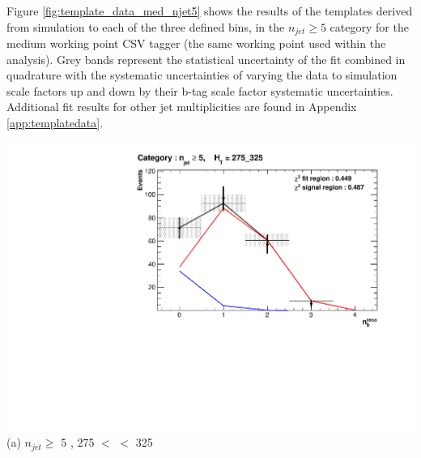 Figure \ref{fig:template_data_med_njet5} shows the results of the templates derived from simulation to each of the three defined \theht bins, in the $n_{jet} \geq 5$ category for the medium working point \ac{CSV} tagger (the same working point used within the \alphat analysis).  Grey bands represent the statistical uncertainty of the fit combined in quadrature with the systematic uncertainties of varying the data to simulation scale factors up and down by their b-tag scale factor systematic uncertainties.  Additional fit results for other jet multiplicities are found in Appendix \ref{app:templatedata}.

\begin{minipage}{\textwidth}
\footnotesize
\centering
\begin{minipage}[b]{0.51 \linewidth}
\includegraphics[width = 1.0\linewidth]{plots/ThesisPlots/Final_Fit_To_Data_Normal_Medium_HTBin_OneMuon_275_325_jet_mult_5.pdf}
\centering (a) $n_{jet} \geq$  5 , 275 $<$ \theht $<$ 325
\end{minipage}
\end{minipage}

